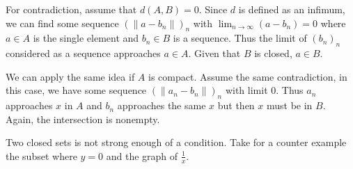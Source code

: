\documentclass[../main.tex]{subfiles}
\begin{document}
For contradiction, assume that $d(A, B) = 0$.
Since $d$ is defined as an infimum, we can find some sequence $(\|a - b_n\|)_n$ with $\lim_{n \to \infty} (a - b_n) = 0$ where $a \in A$ is the single element and $b_n \in B$ is a sequence.
Thus the limit of $(b_n)_n$ considered as a sequence approaches $a \in A$.
Given that $B$ is closed, $a \in B$.

We can apply the same idea if $A$ is compact.
Assume the same contradiction, in this case, we have some sequence $(\|a_n - b_n\|)_n$ with limit $0$.
Thus $a_n$ approaches $x$ in $A$ and $b_n$ approaches the same $x$ but then $x$ must be in $B$.
Again, the intersection is nonempty.

Two closed sets is not strong enough of a condition.
Take for a counter example the subset where $y = 0$ and the graph of $\frac{1}{x}$.
\end{document}
